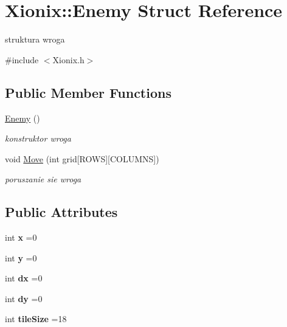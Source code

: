 \hypertarget{struct_xionix_1_1_enemy}{}\section{Xionix\+::Enemy Struct Reference}
\label{struct_xionix_1_1_enemy}


struktura wroga  




{\ttfamily \#include $<$Xionix.\+h$>$}

\subsection*{Public Member Functions}
\begin{DoxyCompactItemize}
\item 
\mbox{\label{struct_xionix_1_1_enemy_a5c5ff1cb45419d61731874ea7dc22a0b}} 
\mbox{\hyperlink{struct_xionix_1_1_enemy_a5c5ff1cb45419d61731874ea7dc22a0b}{Enemy}} ()
\begin{DoxyCompactList}\small\item\em konstruktor wroga \end{DoxyCompactList}\item 
void \mbox{\hyperlink{struct_xionix_1_1_enemy_aa37b00bb10fedf6d3f678216ed496415}{Move}} (int grid\mbox{[}R\+O\+WS\mbox{]}\mbox{[}C\+O\+L\+U\+M\+NS\mbox{]})
\begin{DoxyCompactList}\small\item\em poruszanie sie wroga \end{DoxyCompactList}\end{DoxyCompactItemize}
\subsection*{Public Attributes}
\begin{DoxyCompactItemize}
\item 
\mbox{\label{struct_xionix_1_1_enemy_a74ec58bcfdc524e7e261012e0b561b6a}} 
int {\bfseries x} =0
\item 
\mbox{\label{struct_xionix_1_1_enemy_acdd6ab52647c2091cdc34d98442d0223}} 
int {\bfseries y} =0
\item 
\mbox{\label{struct_xionix_1_1_enemy_ae677fc211e1721576c1a2b48bfb45ecb}} 
int {\bfseries dx} =0
\item 
\mbox{\label{struct_xionix_1_1_enemy_a28f6c747504ebe7c3e70c39872edd9ca}} 
int {\bfseries dy} =0
\item 
\mbox{\label{struct_xionix_1_1_enemy_a9cbe803b854b4368952066fcc8cde2e1}} 
int {\bfseries tile\+Size} =18
\end{DoxyCompactItemize}


